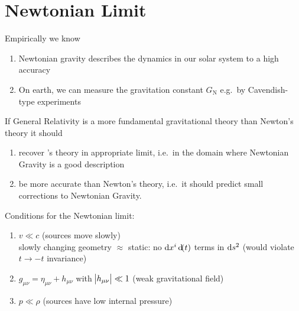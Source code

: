 \section{Newtonian Limit}
Empirically we know
\begin{enumerate}
    \item Newtonian gravity describes the dynamics in our solar system to a high accuracy
    \item On earth, we can measure the gravitation constant $G_\text{N}$ e.g.\ by Cavendish-type  experiments
\end{enumerate}
If General Relativity is a more fundamental gravitational theory than Newton's theory it should
\begin{enumerate}
    \item recover 's theory in appropriate limit, i.e.\ in the domain where Newtonian Gravity is a good description
    \item be more accurate than Newton's theory, i.e.\ it should predict small corrections to Newtonian Gravity.
\end{enumerate}
Conditions for the Newtonian limit:
\begin{enumerate}
    \item $v \ll c$ (sources move slowly) \\
    slowly changing geometry $\approx$ static: no $\dif{x}^i\dif(t)$ terms in $\dif{s}^2$ (would violate $t\rightarrow -t$ invariance)
    \item $g_{\mu\nu} = \eta_{\mu\nu} + h_{\mu\nu}$ with $\abs{h_{\mu\nu}} \ll 1$ (weak gravitational field)
    \item $p \ll \rho$ (sources have low internal pressure)
\end{enumerate}
